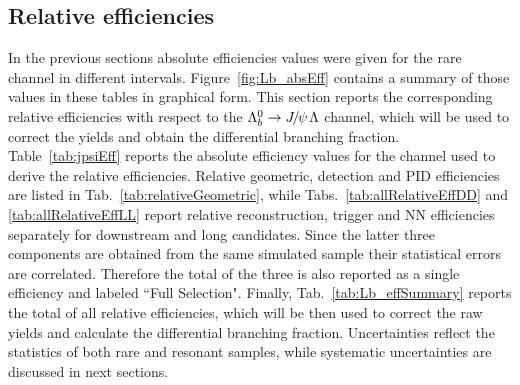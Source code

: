 \subsection{Relative efficiencies}

In the previous sections absolute efficiencies values were given for the rare channel in different \qsq intervals.
Figure~\ref{fig:Lb_absEff} contains a summary of those values in these tables in graphical form.
This section reports the corresponding relative efficiencies with respect to the $\Lb\to\jpsi\Lz$ channel, which will be
used to correct the yields and obtain the differential branching fraction. Table~\ref{tab:jpsiEff} reports the absolute 
efficiency values for the \jpsi channel used to derive the relative efficiencies.
Relative geometric, detection and PID efficiencies are listed in Tab.~\ref{tab:relativeGeometric}, while
Tabs.~\ref{tab:allRelativeEffDD} and \ref{tab:allRelativeEffLL} report relative reconstruction, trigger and NN efficiencies 
separately for downstream and long candidates. Since the latter three components are obtained from the 
same simulated sample their statistical errors are correlated. Therefore the total of the three is also reported 
as a single efficiency and labeled ``Full Selection". Finally, Tab.~\ref{tab:Lb_effSummary} reports the total of 
all relative efficiencies, which will be then used to correct the raw yields and calculate the differential branching fraction.
Uncertainties reflect the statistics of both rare and resonant samples, while systematic uncertainties are discussed in next sections.

\begin{table}
\centering
\caption{Absolute efficiency values for $\Lb\to\jpsi\Lz$. Uncertainties are statistical only.}
\label{tab:jpsiEff}
\end{table}


